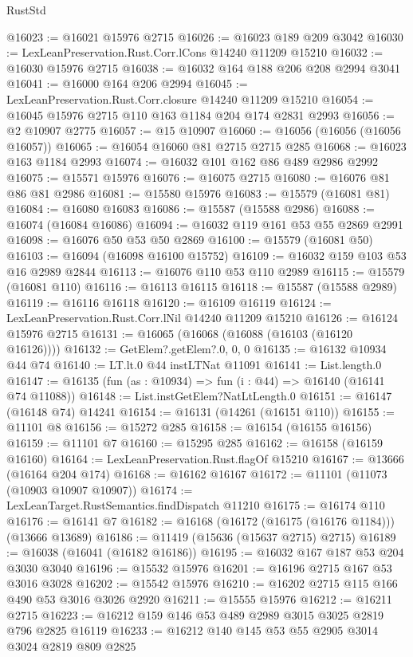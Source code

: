 \begin{lexlean}{RustStd}
\begin{coremodule}
@16023 := @16021 @15976 @2715
@16026 := @16023 @189 @209 @3042
@16030 := LexLeanPreservation.Rust.Corr.lCons @14240 @11209 @15210
@16032 := @16030 @15976 @2715
@16038 := @16032 @164 @188 @206 @208 @2994 @3041
@16041 := @16000 @164 @206 @2994
@16045 := LexLeanPreservation.Rust.Corr.closure @14240 @11209 @15210
@16054 := @16045 @15976 @2715 @110 @163 @1184 @204 @174 @2831 @2993
@16056 := @2 @10907 @2775
@16057 := @15 @10907
@16060 := @16056 (@16056 (@16056 @16057))
@16065 := @16054 @16060 @81 @2715 @2715 @285
@16068 := @16023 @163 @1184 @2993
@16074 := @16032 @101 @162 @86 @489 @2986 @2992
@16075 := @15571 @15976
@16076 := @16075 @2715
@16080 := @16076 @81 @86 @81 @2986
@16081 := @15580 @15976
@16083 := @15579 (@16081 @81)
@16084 := @16080 @16083
@16086 := @15587 (@15588 @2986)
@16088 := @16074 (@16084 @16086)
@16094 := @16032 @119 @161 @53 @55 @2869 @2991
@16098 := @16076 @50 @53 @50 @2869
@16100 := @15579 (@16081 @50)
@16103 := @16094 (@16098 @16100 @15752)
@16109 := @16032 @159 @103 @53 @16 @2989 @2844
@16113 := @16076 @110 @53 @110 @2989
@16115 := @15579 (@16081 @110)
@16116 := @16113 @16115
@16118 := @15587 (@15588 @2989)
@16119 := @16116 @16118
@16120 := @16109 @16119
@16124 := LexLeanPreservation.Rust.Corr.lNil @14240 @11209 @15210
@16126 := @16124 @15976 @2715
@16131 := @16065 (@16068 (@16088 (@16103 (@16120 @16126))))
@16132 := GetElem?.getElem?.{0, 0, 0}
@16135 := @16132 @10934 @44 @74
@16140 := LT.lt.{0} @44 instLTNat @11091
@16141 := List.length.{0}
@16147 := @16135 (fun (as : @10934) => fun (i : @44) => @16140 (@16141 @74 @11088))
@16148 := List.instGetElem?NatLtLength.{0}
@16151 := @16147 (@16148 @74) @14241
@16154 := @16131 (@14261 (@16151 @110))
@16155 := @11101 @8
@16156 := @15272 @285
@16158 := @16154 (@16155 @16156)
@16159 := @11101 @7
@16160 := @15295 @285
@16162 := @16158 (@16159 @16160)
@16164 := LexLeanPreservation.Rust.flagOf @15210
@16167 := @13666 (@16164 @204 @174)
@16168 := @16162 @16167
@16172 := @11101 (@11073 (@10903 @10907 @10907))
@16174 := LexLeanTarget.RustSemantics.findDispatch @11210
@16175 := @16174 @110
@16176 := @16141 @7
@16182 := @16168 (@16172 (@16175 (@16176 @1184))) (@13666 @13689)
@16186 := @11419 (@15636 (@15637 @2715) @2715)
@16189 := @16038 (@16041 (@16182 @16186))
@16195 := @16032 @167 @187 @53 @204 @3030 @3040
@16196 := @15532 @15976
@16201 := @16196 @2715 @167 @53 @3016 @3028
@16202 := @15542 @15976
@16210 := @16202 @2715 @115 @166 @490 @53 @3016 @3026 @2920
@16211 := @15555 @15976
@16212 := @16211 @2715
@16223 := @16212 @159 @146 @53 @489 @2989 @3015 @3025 @2819 @796 @2825 @16119
@16233 := @16212 @140 @145 @53 @55 @2905 @3014 @3024 @2819 @809 @2825

\end{coremodule}
\end{lexlean}
